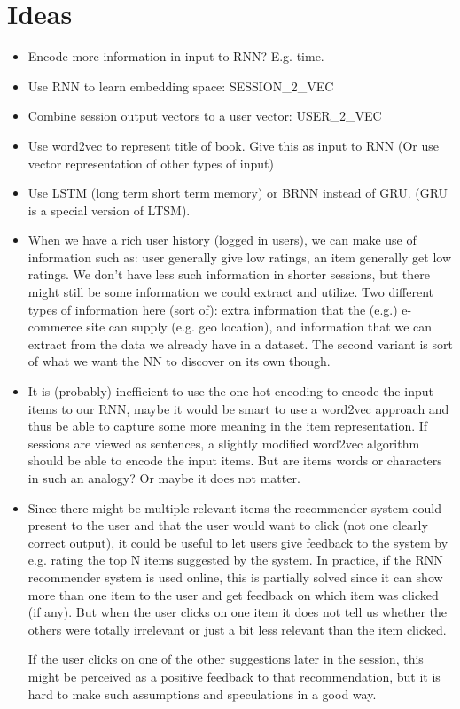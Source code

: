\chapter{Ideas}

\begin{itemize}
	\item Encode more information in input to RNN? E.g. time.
	\item Use RNN to learn embedding space: SESSION\_2\_VEC
	\item Combine session output vectors to a user vector: USER\_2\_VEC
	\item Use word2vec to represent title of book. Give this as input to RNN (Or use vector representation of other types of input)
	\item Use LSTM (long term short term memory) or BRNN instead of GRU. (GRU is a special version of LTSM). 
	\item When we have a rich user history (logged in users), we can make use of information such as:  user generally give low ratings, an item generally get low ratings. We don't have less such information in shorter sessions, but there might still be some information we could extract and utilize. Two different types of information here (sort of): extra information that the (e.g.) e-commerce site can supply (e.g. geo location), and information that we can extract from the data we already have in a dataset. The second variant is sort of what we want the NN to discover on its own though.
	\item It is (probably) inefficient to use the one-hot encoding to encode the input items to our RNN, maybe it would be smart to use a word2vec approach and thus be able to capture some more meaning in the item representation. If sessions are viewed as sentences, a slightly modified word2vec algorithm should be able to encode the input items. But are items words or characters in such an analogy? Or maybe it does not matter.
	\item Since there might be multiple relevant items the recommender system could present to the user and that the user would want to click (not one clearly correct output), it could be useful to let users give feedback to the system by e.g. rating the top N items suggested by the system. In practice, if the RNN recommender system is used online, this is partially solved since it can show more than one item to the user and get feedback on which item was clicked (if any). But when the user clicks on one item it does not tell us whether the others were totally irrelevant or just a bit less relevant than the item clicked. 
	
	If the user clicks on one of the other suggestions later in the session, this might be perceived as a positive feedback to that recommendation, but it is hard to make such assumptions and speculations in a good way.
	
	
	
\end{itemize}